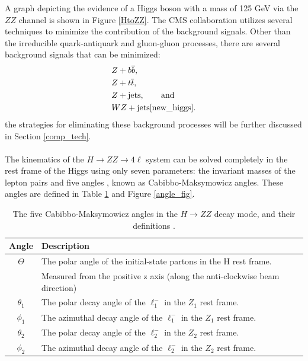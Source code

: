 \documentclass[12pt]{article}
\newcommand{\npar}{\\ \\ \noindent}
\begin{document}
A graph depicting the evidence of a Higgs boson with a mass of 125 GeV via the $ZZ$ channel is shown in Figure \ref{HtoZZ}. The CMS collaboration utilizes several techniques to minimize the contribution of the background signals. Other than the irreducible quark-antiquark and gluon-gluon processes, there are several background signals that can be minimized:
\begin{align}
& Z + b \overline{b}, \\
& Z + t \overline{t}, \\
& Z + \text{jets}, \qquad \text{and}\\
& WZ + \text{jets} \cite{new_higgs}.
\end{align}
the strategies for eliminating these background processes will be further discussed in Section \ref*{comp_tech}.
\npar
The kinematics of the $H \to ZZ \to 4 \ell$ system can be solved completely in the rest frame of the Higgs using only seven parameters: the invariant masses of the lepton pairs and five angles \cite{new_higgs}, known as Cabibbo-Maksymowicz angles\cite{higgs_angles}. These angles are defined in Table \ref{angle_table} and Figure \ref{angle_fig}. 
\begin{table}[H]
\centering
\begin{tabular}{|c|l|}
\hline
Angle & Description \\ \hline \hline
$\Theta$ & The polar angle of the initial-state partons in the H rest frame. \\ & Measured from the positive z axis (along the anti-clockwise beam direction) \\ \hline
$\theta_1$ & The polar decay angle of the $\ell_1^-$ in the $Z_1$ rest frame. \\ \hline
$\phi_1$ & The azimuthal decay angle of the $\ell_1^-$ in the $Z_1$ rest frame. \\ \hline  
$\theta_2$ & The polar decay angle of the $\ell_2^-$ in the $Z_2$ rest frame. \\ \hline
$\phi_2$ &  The azimuthal decay angle of the $\ell_2^-$ in the $Z_2$ rest frame. \\ \hline
\end{tabular}
\caption{The five Cabibbo-Maksymowicz angles in the $H \to ZZ$ decay mode, and their definitions \cite{higgs_angles}.}
\label{angle_table}
\end{table}
\end{document}
